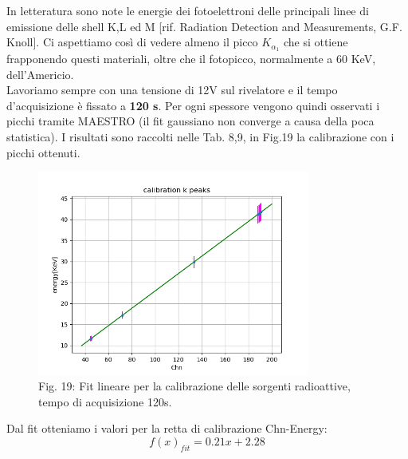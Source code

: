 \documentclass[a4paper]{article}
\begin{document}
In letteratura sono note le energie dei fotoelettroni delle principali linee di emissione delle shell K,L ed M [rif. Radiation Detection and Measurements, G.F. Knoll].
 Ci aspettiamo così di vedere almeno il picco \textbf{$K_{\alpha_{1}}$} che si ottiene frapponendo questi materiali, oltre che il fotopicco, normalmente a 60 KeV, dell'Americio. \\
Lavoriamo sempre con una tensione di 12V sul rivelatore e il tempo d'acquisizione è fissato a \textbf{120 s}. Per ogni spessore vengono quindi osservati i picchi tramite MAESTRO (il fit gaussiano non converge a causa della poca statistica). I risultati sono raccolti nelle Tab. 8,9, in Fig.19 la calibrazione con i picchi ottenuti.\\
\begin{figure}[H]
\includegraphics[width=0.8\textwidth]{calibration_test_signals_new}
        \caption{Fig. 19: Fit lineare per la calibrazione delle sorgenti radioattive, tempo di acquisizione 120s.}
        \label{fig:19}
\end{figure}        
\newpage
Dal fit otteniamo i valori per la retta di calibrazione Chn-Energy:
\begin{equation}
f(x)_{fit}=0.21x+2.28
\end{equation}
\end{document}
